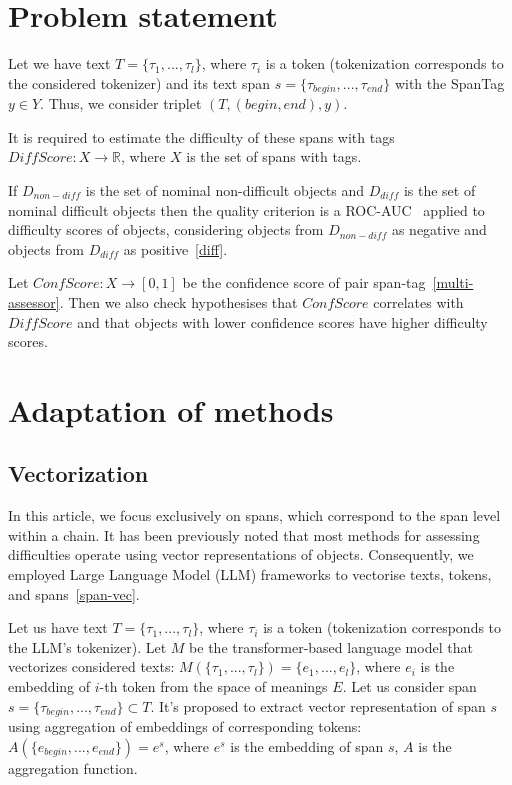 \documentclass{article}
\begin{document}
\section{Problem statement}
Let we have text $T = \{\tau_1, ..., \tau_l\}$, where $\tau_i$ is a token (tokenization corresponds to the considered tokenizer) and its text span $s = \{\tau_{begin}, ..., \tau_{end}\}$ with the SpanTag $y \in Y$. Thus, we consider triplet $(T, (begin, end), y)$.

It is required to estimate the difficulty of these spans with tags $DiffScore: X \rightarrow \mathbb{R}$, where $X$ is the set of spans with tags. 

If $D_{non-diff}$ is the set of nominal non-difficult objects and $D_{diff}$ is the set of nominal difficult objects then the quality criterion is a ROC-AUC~\cite{fawcett2006introduction} applied to difficulty scores of objects, considering objects from $D_{non-diff}$ as negative and objects from $D_{diff}$ as positive~\ref{diff}.  

Let $ConfScore: X \rightarrow [0,1]$ be the confidence score of pair span-tag~\ref{multi-assessor}. Then we also check hypothesises that $ConfScore$ correlates with $DiffScore$ and that objects with lower confidence scores have higher difficulty scores.

\section{Adaptation of methods}

\subsection{Vectorization}
In this article, we focus exclusively on spans, which correspond to the span level within a chain. It has been previously noted that most methods for assessing difficulties operate using vector representations of objects. Consequently, we employed Large Language Model (LLM) frameworks to vectorise texts, tokens, and spans~\ref{span-vec}. 

Let us have text $T = \{\tau_1, ..., \tau_l\}$, where $\tau_i$ is a token (tokenization corresponds to the LLM's tokenizer). Let $M$ be the transformer-based language model that vectorizes considered texts: $M(\{\tau_1, ..., \tau_l\}) = \{e_1, ..., e_l\}$, where $e_i$ is the embedding of $i$-th token from the space of meanings $E$. Let us consider span $s = \{\tau_{begin}, ..., \tau_{end}\} \subset T$. It's proposed to extract vector representation of span $s$ using aggregation of embeddings of corresponding tokens: $A(\{e_{begin}, ..., e_{end}\}) = e^s$, where $e^s$ is the embedding of span $s$, $A$ is the aggregation function.
\end{document}
